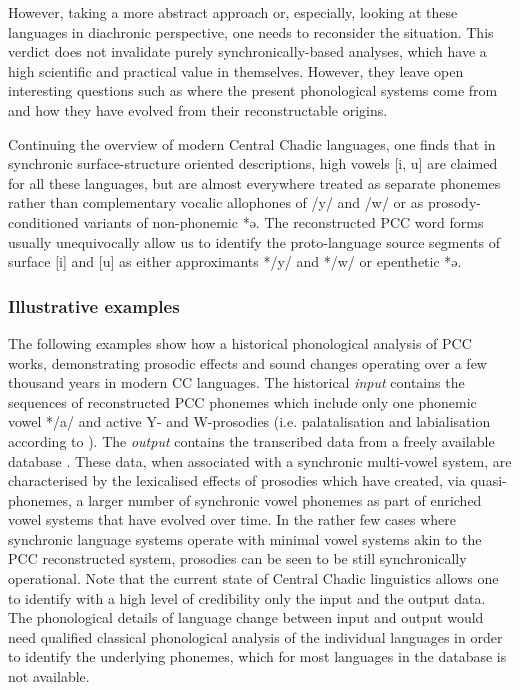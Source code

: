\documentclass[output=paper]{langscibook}
\begin{document}
However, taking a more abstract approach or, especially, looking at these languages in diachronic perspective, one needs to reconsider the situation. This verdict does not invalidate purely synchronically-based analyses, which have a high scientific and practical value in themselves. However, they leave open interesting questions such as where the present phonological systems come from and how they have evolved from their reconstructable origins. 

\hspace*{-3pt}Continuing the overview of modern Central Chadic languages, one finds that in synchronic surface-structure oriented descriptions, high vowels [i, u] are claimed for all these languages, but are almost everywhere treated as separate phonemes rather than complementary vocalic allophones of /y/ and /w/ or as prosody-conditioned variants of non-phonemic *ə. The reconstructed PCC word forms usually unequivocally allow us to identify the proto-language source segments of surface [i] and [u] as either approximants */y/ and */w/ or epenthetic *ə.

\subsubsection{Illustrative examples}
\label{sec:Wolff:2.3.4}

The following examples show how a historical phonological analysis of PCC works, demonstrating prosodic effects and sound changes operating over a few thousand years in modern CC languages. The historical \textit{input} contains the sequences of reconstructed PCC phonemes which include only one phonemic vowel */a/ and active Y- and W-prosodies (i.e. palatalisation and labialisation according to \citealt{Wolff2022a, Wolffinpressb}). The \textit{output} contains the transcribed data from a freely available database \citep{Gravina2015}. These data, when associated with a synchronic multi-vowel system, are characterised by the lexicalised effects of prosodies which have created, via quasi-phonemes, a larger number of synchronic vowel phonemes as part of enriched vowel systems that have evolved over time. In the rather few cases where synchronic language systems operate with minimal vowel systems akin to the PCC reconstructed system, prosodies can be seen to be still synchronically operational. Note that the current state of Central Chadic linguistics allows one to identify with a high level of credibility only the input and the output data. The phonological details of language change between input and output would need qualified classical phonological analysis of the individual languages in order to identify the underlying phonemes, which for most languages in the database is not available. 
\end{document}
